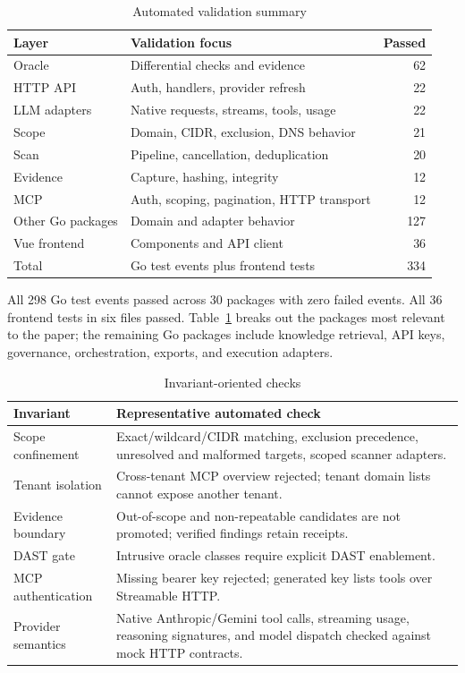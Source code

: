 \documentclass[conference,a4paper]{IEEEtran}
\begin{document}
\begin{table}[t]
\centering
\caption{Automated validation summary}
\label{tab:validation}
\begin{tabular}{p{}p{}r}
\toprule
Layer & Validation focus & Passed \\
\midrule
Oracle & Differential checks and evidence & 62 \\
HTTP API & Auth, handlers, provider refresh & 22 \\
LLM adapters & Native requests, streams, tools, usage & 22 \\
Scope & Domain, CIDR, exclusion, DNS behavior & 21 \\
Scan & Pipeline, cancellation, deduplication & 20 \\
Evidence & Capture, hashing, integrity & 12 \\
MCP & Auth, scoping, pagination, HTTP transport & 12 \\
Other Go packages & Domain and adapter behavior & 127 \\
Vue frontend & Components and API client & 36 \\
\midrule
Total & Go test events plus frontend tests & 334 \\
\bottomrule
\end{tabular}
\end{table}

All 298 Go test events passed across 30 packages with zero failed events. All 36 frontend tests in six files passed. Table~\ref{tab:validation} breaks out the packages most relevant to the paper; the remaining Go packages include knowledge retrieval, API keys, governance, orchestration, exports, and execution adapters.

\begin{table}[t]
\centering
\caption{Invariant-oriented checks}
\label{tab:invariants}
\begin{tabular}{p{}p{}}
\toprule
Invariant & Representative automated check \\
\midrule
Scope confinement & Exact/wildcard/CIDR matching, exclusion precedence, unresolved and malformed targets, scoped scanner adapters. \\
Tenant isolation & Cross-tenant MCP overview rejected; tenant domain lists cannot expose another tenant. \\
Evidence boundary & Out-of-scope and non-repeatable candidates are not promoted; verified findings retain receipts. \\
DAST gate & Intrusive oracle classes require explicit DAST enablement. \\
MCP authentication & Missing bearer key rejected; generated key lists tools over Streamable HTTP. \\
Provider semantics & Native Anthropic/Gemini tool calls, streaming usage, reasoning signatures, and model dispatch checked against mock HTTP contracts. \\
\bottomrule
\end{tabular}
\end{table}
\end{document}
